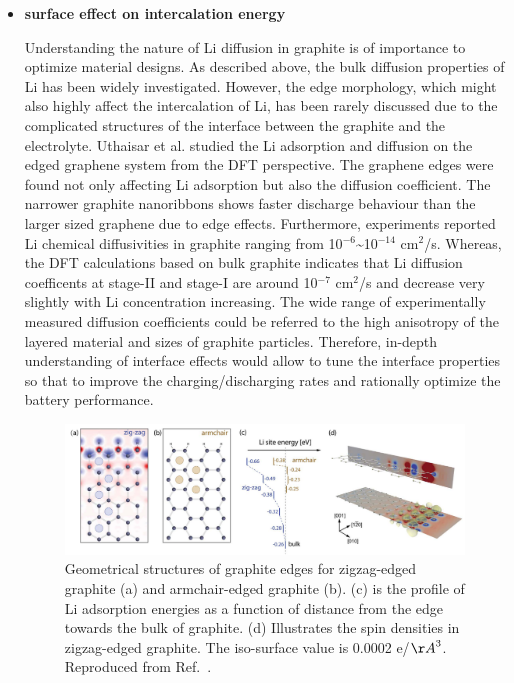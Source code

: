 \documentclass[journal=jacsat,manuscript=article]{achemso}
\begin{document}
\begin{itemize}
    \item \textbf{surface effect on intercalation energy} 

    
    Understanding the nature of Li diffusion in graphite is of importance to optimize material designs. As described above, the bulk diffusion properties of Li has been widely investigated.\cite{persson2010,toyoura2008first,toyoura2010effects,yao2012diffusion,thinius2014theoretical} However, the edge morphology, which might also highly affect the intercalation of Li, has been rarely discussed due to the complicated structures of the interface between the graphite and the electrolyte.
    Uthaisar et al. studied the Li adsorption and diffusion on the edged graphene system from the DFT perspective.\cite{uthaisar2010edge} The graphene edges were found not only affecting Li adsorption but also the diffusion coefficient. The narrower graphite nanoribbons shows faster discharge behaviour than the larger sized graphene due to edge effects.
    Furthermore, experiments reported Li chemical diffusivities in graphite ranging from 10$^{-6}$\sim10$^{-14}$ cm$^2$/s.\cite{toyoura2010effects} Whereas, the DFT calculations based on bulk graphite indicates that Li diffusion coefficents at stage-II and stage-I are around 10$^{-7}$ cm$^2$/s and decrease very slightly with Li concentration increasing.\cite{persson2010}  The wide range of experimentally measured diffusion coefficients could be referred to the high anisotropy of the layered material and sizes of graphite particles.
    Therefore, in-depth understanding of interface effects would allow to tune the interface properties so that to improve the charging/discharging rates and rationally optimize the battery performance.

    \begin{figure}
        \centering
        \includegraphics[scale=0.5]{figures/Intercalation energies.PNG}
        \caption{Geometrical structures of graphite edges for zigzag-edged graphite (a) and armchair-edged graphite (b). (c) is the profile of Li adsorption energies as a function of distance from the edge towards the bulk of graphite. (d) Illustrates the spin densities in zigzag-edged graphite. The iso-surface value is 0.0002 e/${\AA}^3$. Reproduced from Ref.~.}
        \label{fig:arm_zig}
    \end{figure}
    

\end{itemize}
\end{document}
